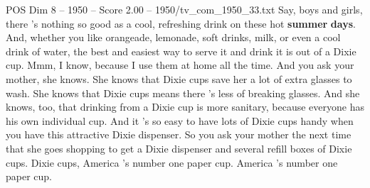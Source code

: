 \begin{textsample}{POS Dim 8 – 1950 – Score 2.00 – 1950/tv\_com\_1950\_33.txt}  \label{ex:f8_pos_017}
Say, boys and girls, there 's nothing so good as a cool, refreshing drink on these hot \textbf{summer} \textbf{days}.
And, whether you like orangeade, lemonade, soft drinks, milk, or even a cool drink of water, the best and easiest way to serve it and drink it is out of a Dixie cup.
Mmm, I know, because I use them at home all the time.
And you ask your mother, she knows.
She knows that Dixie cups save her a lot of extra glasses to wash.
She knows that Dixie cups means there 's less of breaking glasses.
And she knows, too, that drinking from a Dixie cup is more sanitary, because everyone has his own individual cup.
And it 's so easy to have lots of Dixie cups handy when you have this attractive Dixie dispenser.
So you ask your mother the next time that she goes shopping to get a Dixie dispenser and several refill boxes of Dixie cups.
Dixie cups, America 's number one paper cup.
America 's number one paper cup.

\end{textsample}
